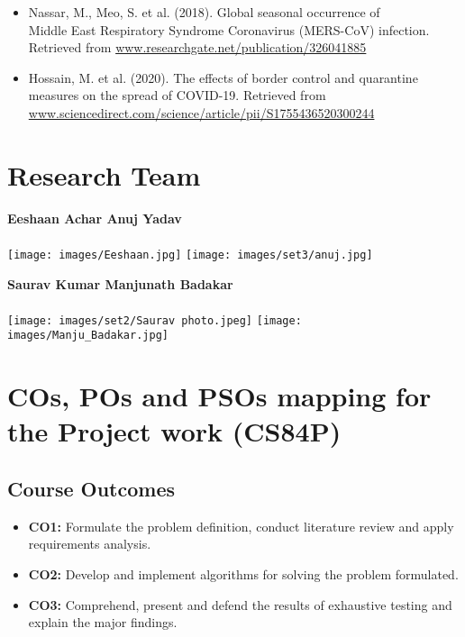 \documentclass[12pt, a4paper]{extarticle}
\begin{document}
\begin{itemize}
                \item Nassar, M., Meo, S. et al. (2018). Global seasonal occurrence of \\Middle East Respiratory Syndrome Coronavirus (MERS-CoV) infection. Retrieved from \url{www.researchgate.net/publication/326041885}
                
                \item Hossain, M. et al. (2020). The effects of border control and quarantine measures on the spread of COVID-19. Retrieved from \url{www.sciencedirect.com/science/article/pii/S1755436520300244}
            \end{itemize}
     
    \appendix
    
    \newpage
    \section{Research Team}
        \vspace{0.5in}
        \textbf{
            \hspace{0.6in} Eeshaan Achar
            \hspace{2in} Anuj Yadav
        }\\\\
        \texttt{[image: images/Eeshaan.jpg]}
        \hspace{0.5in}
        \texttt{[image: images/set3/anuj.jpg]}
        
        \vspace{0.5in}
        \textbf{
            \hspace{0.25in} Saurav Kumar
            \hspace{1.75in} Manjunath Badakar
        }\\\\
        \texttt{[image: images/set2/Saurav photo.jpeg]}
        \hspace{0.5in}
        \texttt{[image: images/Manju\_Badakar.jpg]}
    
    \newpage
    \section{COs, POs and PSOs mapping for the Project work (CS84P)}
        \subsection{Course Outcomes}
        \begin{itemize}
        	\item[]\textbf{CO1:} Formulate the problem definition, conduct literature review and apply requirements analysis.
        	\item[]\textbf{CO2:} Develop and implement algorithms for solving the problem formulated.
        	\item[]\textbf{CO3:} Comprehend, present and defend the results of exhaustive testing and explain the major findings.
        \end{itemize}
\end{document}
